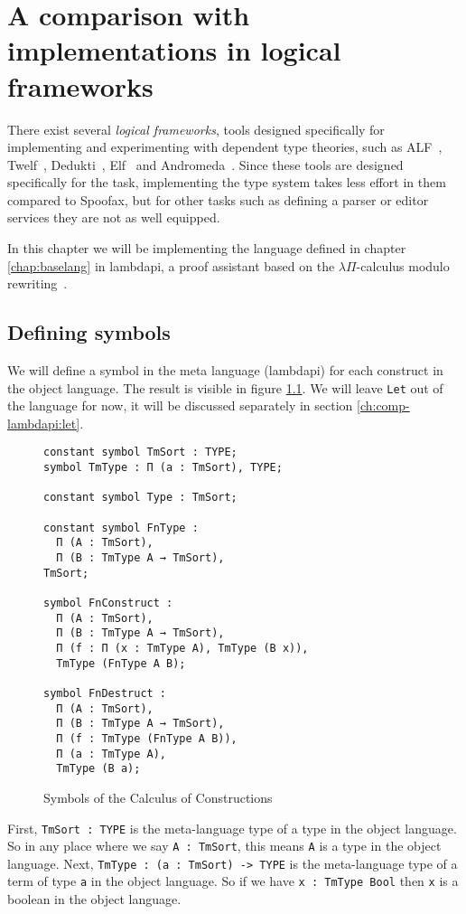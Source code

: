\chapter{A comparison with implementations in logical frameworks}
\label{ch:comp-lambdapi}

There exist several \emph{logical frameworks}, tools designed specifically for implementing and experimenting with dependent type theories, such as ALF~\cite{MagnussonN93}, Twelf~\cite{PfenningS99}, Dedukti~\cite{BoespflugCH12}, Elf~\cite{pfenning_1991} and Andromeda~\cite{BauerHP20}. Since these tools are designed specifically for the task, implementing the type system takes less effort in them compared to Spoofax, but for other tasks such as defining a parser or editor services they are not as well equipped. 

In this chapter we will be implementing the language defined in chapter \ref{chap:baselang} in lambdapi, a proof assistant based on the $\lambda \Pi$-calculus modulo rewriting~\cite{BoespflugCH12}. 

\section{Defining symbols}

We will define a symbol in the meta language (lambdapi) for each construct in the object language. The result is visible in figure \ref{fig:lp-symbols}. We will leave \verb|Let| out of the language for now, it will be discussed separately in section \ref{ch:comp-lambdapi:let}.

\begin{figure}[ht]
\begin{lstlisting}
constant symbol TmSort : TYPE;
symbol TmType : Π (a : TmSort), TYPE;

constant symbol Type : TmSort;

constant symbol FnType :
  Π (A : TmSort), 
  Π (B : TmType A → TmSort), 
TmSort;

symbol FnConstruct :
  Π (A : TmSort), 
  Π (B : TmType A → TmSort), 
  Π (f : Π (x : TmType A), TmType (B x)), 
  TmType (FnType A B);

symbol FnDestruct :
  Π (A : TmSort), 
  Π (B : TmType A → TmSort), 
  Π (f : TmType (FnType A B)),
  Π (a : TmType A),
  TmType (B a);
\end{lstlisting}
	\caption{Symbols of the Calculus of Constructions}
\label{fig:lp-symbols}
\end{figure}

First, \verb|TmSort : TYPE| is the meta-language type of a type in the object language. So in any place where we say \verb|A : TmSort|, this means \verb|A| is a type in the object language. Next, \verb|TmType : (a : TmSort) -> TYPE| is the meta-language type of a term of type \verb|a| in the object language. So if we have \verb|x : TmType Bool| then \verb|x| is a boolean in the object language. 

